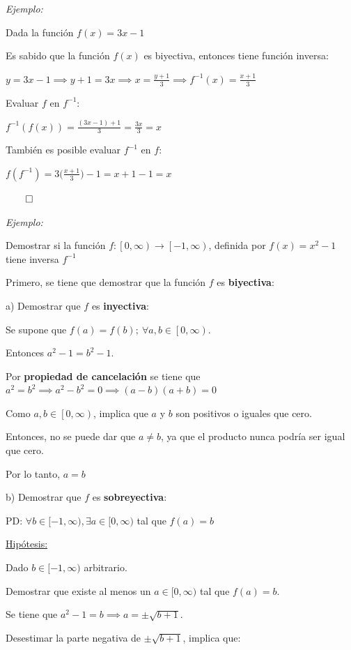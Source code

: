 \documentclass{article}
\begin{document}
\textit{Ejemplo:}

Dada la función $f(x) = 3x - 1$

Es sabido que la función $f(x)$ es biyectiva, entonces tiene función inversa:

$\displaystyle y = 3x - 1 \implies y + 1 = 3x \implies x = \frac{y + 1}{3} \implies f^{-1}(x) = \frac{x + 1}{3}$

Evaluar $f$ en $f^{-1}$:

$\displaystyle f^{-1}(f(x)) = \frac{(3x - 1) + 1}{3} = \frac{3x}{3} = x$

También es posible evaluar $f^{-1}$ en $f$:

$\displaystyle f(f^{-1}) = 3\Big(\frac{x + 1}{3}\Big) - 1 = x + 1 - 1 = x$

$\qed$

\textit{Ejemplo:}

Demostrar si la función $f: \left[0, \infty\right) \to \left[-1, \infty\right)$, definida por $f(x) = x^2 - 1$ tiene inversa $f^{-1}$

Primero, se tiene que demostrar que la función $f$ es \textbf{biyectiva}:

a) Demostrar que $f$ es \textbf{inyectiva}:

Se supone que $f(a) = f(b); \  \forall a,b \in \left[0, \infty \right)$.

Entonces $a^2 - 1 = b^2 - 1$.

Por \textbf{propiedad de cancelación} se tiene que $a^2 = b^2 \implies a^2 - b^2 = 0 \implies (a - b)(a + b) = 0$

Como $a, b \in \left[0, \infty \right)$, implica que $a$ y $b$ son positivos o iguales que cero.

Entonces, no se puede dar que $a \neq b$, ya que el producto nunca podría ser igual que cero.

Por lo tanto, $a = b$

b) Demostrar que $f$ es \textbf{sobreyectiva}:

PD: $\forall b \in [-1, \infty), \exists a \in [0, \infty)$ tal que $f(a) = b$

\underline{Hipótesis:}

Dado $b \in [-1, \infty)$ arbitrario.

Demostrar que existe al menos un $a \in [0, \infty)$ tal que $f(a) = b$.

Se tiene que $a^2 - 1 = b \implies a = \pm \sqrt{b + 1}$.

Desestimar la parte negativa de $\pm \sqrt{b + 1}$, implica que:
\end{document}
